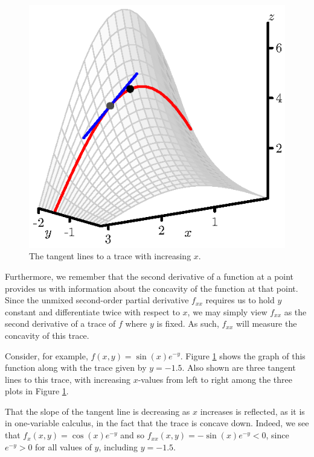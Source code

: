 \begin{figure}[ht]
\begin{center}
    \includegraphics[scale=0.8]{figures/fig_10_3_fxx_3.eps}
  \end{center}
  \caption{The tangent lines to a trace with increasing $x$.}
  \label{F:10.3.fxx}
\end{figure}

Furthermore, we remember that the second derivative of a function at a
point provides us with information about the concavity of the function
at that point.  Since the unmixed second-order partial derivative
$f_{xx}$ requires us to hold $y$ constant and differentiate twice with
respect to $x$, we may simply view $f_{xx}$ as the second derivative
of a trace of $f$ where $y$ is fixed.  As such, $f_{xx}$ will measure
the concavity of this trace.

Consider, for example, $f(x,y) = \sin(x) e^{-y}$.  Figure
\ref{F:10.3.fxx} shows the graph of this function along with the
trace given by $y=-1.5$.  Also shown are three tangent lines to this
trace, with increasing $x$-values from left to right among the three plots in Figure
\ref{F:10.3.fxx}.


That the slope of the tangent line is decreasing as $x$ increases is
reflected, as it is in one-variable calculus, in the fact that the
trace is concave down.  Indeed, we see that $f_x(x,y)=\cos(x)e^{-y}$ and so
$f_{xx}(x,y)=-\sin(x)e^{-y} < 0$, since $e^{-y} > 0$ for all values of $y$, including $y = -1.5$.

